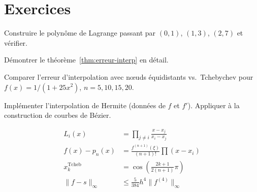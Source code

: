 \section{Exercices}

\begin{exercice}[$\star$]
Construire le polyn\^ome de Lagrange passant par $(0,1)$, $(1,3)$, $(2,7)$ et v\'erifier.
\end{exercice}

\begin{exercice}[$\star\star$]
D\'emontrer le th\'eor\`eme~\ref{thm:erreur-interp} en d\'etail.
\end{exercice}

\begin{exercice}[$\star\star$]
Comparer l'erreur d'interpolation avec n\oe uds \'equidistants vs.\ Tchebychev pour $f(x)=1/(1+25x^2)$, $n=5,10,15,20$.
\end{exercice}

\begin{exercice}
Impl\'ementer l'interpolation de Hermite (donn\'ees de $f$ et $f'$). Appliquer \`a la construction de courbes de B\'ezier.
\end{exercice}

\begin{formules}
\begin{align*}
L_i(x) &= \prod_{j\neq i}\frac{x-x_j}{x_i-x_j} \\
f(x)-p_n(x) &= \frac{f^{(n+1)}(\xi)}{(n+1)!}\prod(x-x_i) \\
x_k^{\text{Tcheb}} &= \cos\!\left(\frac{2k+1}{2(n+1)}\pi\right) \\
\|f-s\|_\infty &\leq \frac{5}{384}h^4\|f^{(4)}\|_\infty
\end{align*}
\end{formules}
